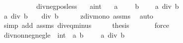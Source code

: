 \begin{isabellebody}
\ \ \ \ \ \ \isamarkupfalse%
\isanewline
\ \ \isamarkupfalse%
\isanewline
{}\isamarkupfalse%
%
\endisatagproof
{\isafoldproof}%
%
\isadelimproof
\isanewline
%
\endisadelimproof
\isanewline
{}\isamarkupfalse%
\ div{\isacharunderscore}{\kern0pt}neg{\isacharunderscore}{\kern0pt}pos{\isacharunderscore}{\kern0pt}less{}{\isacharcolon}{\kern0pt}\isanewline
\ \ \ a{\isacharcolon}{\kern0pt}{\isacharcolon}{\kern0pt}int\isanewline
\ \ \ {\isachardoublequoteopen}a\ {\isacharless}{\kern0pt}\ {}{\isachardoublequoteclose}\ {\isachardoublequoteopen}{}\ {\isacharless}{\kern0pt}\ b{\isachardoublequoteclose}\ \isanewline
\ \ \ {\isachardoublequoteopen}a\ div\ b\ {\isacharless}{\kern0pt}\ {}{\isachardoublequoteclose}\isanewline
%
\isadelimproof
%
\endisadelimproof
%
\isatagproof
{}\isamarkupfalse%
\ {\isacharminus}{\kern0pt}\isanewline
\ \ \isamarkupfalse%
\ {\isachardoublequoteopen}a\ div\ b\ {\isasymle}\ {\isacharminus}{\kern0pt}\ {}\ div\ b{\isachardoublequoteclose}\isanewline
\ \ \ \ \isamarkupfalse%
\ zdiv{\isacharunderscore}{\kern0pt}mono{}\ assms\ \isamarkupfalse%
\ auto\isanewline
\ \ \isamarkupfalse%
\ \isamarkupfalse%
\ {\isachardoublequoteopen}{\isachardot}{\kern0pt}{\isachardot}{\kern0pt}{\isachardot}{\kern0pt}\ {\isasymle}\ {\isacharminus}{\kern0pt}{}{\isachardoublequoteclose}\isanewline
\ \ \ \ \isamarkupfalse%
\ {\isacharparenleft}{\kern0pt}simp\ add{\isacharcolon}{\kern0pt}\ assms{\isacharparenleft}{\kern0pt}{}{\isacharparenright}{\kern0pt}\ div{\isacharunderscore}{\kern0pt}eq{\isacharunderscore}{\kern0pt}minus{}{\isacharparenright}{\kern0pt}\isanewline
\ \ \isamarkupfalse%
\ \isamarkupfalse%
\ {\isacharquery}{\kern0pt}thesis\ \isanewline
\ \ \ \ \isamarkupfalse%
\ force\isanewline
{}\isamarkupfalse%
%
\endisatagproof
{\isafoldproof}%
%
\isadelimproof
\isanewline
%
\endisadelimproof
\isanewline
{}\isamarkupfalse%
\ div{\isacharunderscore}{\kern0pt}nonneg{\isacharunderscore}{\kern0pt}neg{\isacharunderscore}{\kern0pt}le{}{\isacharcolon}{\kern0pt}\ {\isachardoublequoteopen}{\isacharbrackleft}{\kern0pt}{\isacharbar}{\kern0pt}\ {\isacharparenleft}{\kern0pt}{}{\isacharcolon}{\kern0pt}{\isacharcolon}{\kern0pt}int{\isacharparenright}{\kern0pt}\ {\isasymle}\ a{\isacharsemicolon}{\kern0pt}\ b\ {\isacharless}{\kern0pt}\ {}\ {\isacharbar}{\kern0pt}{\isacharbrackright}{\kern0pt}\ {\isacharequal}{\kern0pt}{\isacharequal}{\kern0pt}{\isachargreater}{\kern0pt}\ a\ div\ b\ {\isasymle}\ {}{\isachardoublequoteclose}\isanewline

\end{isabellebody}
